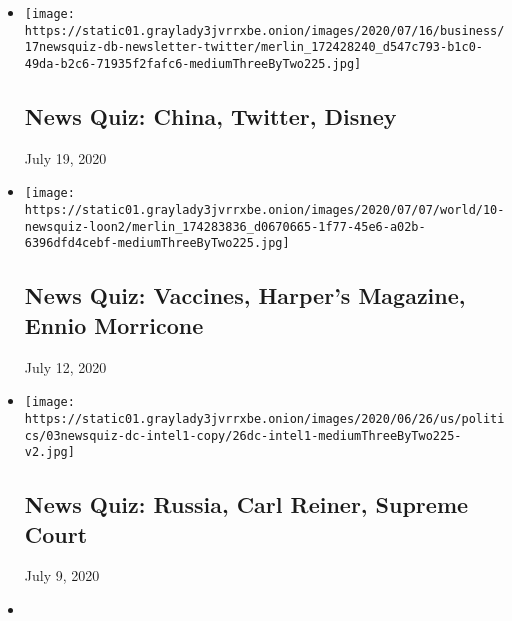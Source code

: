 \begin{itemize}
\item
  \href{https://www.nytimes3xbfgragh.onion/interactive/2020/07/17/briefing/china-twitter-disney-news-quiz.html}{}

  \texttt{[image: https://static01.graylady3jvrrxbe.onion/images/2020/07/16/business/17newsquiz-db-newsletter-twitter/merlin\_172428240\_d547c793-b1c0-49da-b2c6-71935f2fafc6-mediumThreeByTwo225.jpg]}

  \hypertarget{news-quiz-china-twitter-disney}{%
  \subsection{News Quiz: China, Twitter,
  Disney}\label{news-quiz-china-twitter-disney}}

  July 19, 2020
\item
  \href{https://www.nytimes3xbfgragh.onion/interactive/2020/07/10/briefing/vaccines-harpers-magazine-ennio-morricone-news-quiz.html}{}

  \texttt{[image: https://static01.graylady3jvrrxbe.onion/images/2020/07/07/world/10-newsquiz-loon2/merlin\_174283836\_d0670665-1f77-45e6-a02b-6396dfd4cebf-mediumThreeByTwo225.jpg]}

  \hypertarget{news-quiz-vaccines-harpers-magazine-ennio-morricone}{%
  \subsection{News Quiz: Vaccines, Harper's Magazine, Ennio
  Morricone}\label{news-quiz-vaccines-harpers-magazine-ennio-morricone}}

  July 12, 2020
\item
  \href{https://www.nytimes3xbfgragh.onion/interactive/2020/07/03/briefing/russia-carl-reiner-supreme-court-news-quiz.html}{}

  \texttt{[image: https://static01.graylady3jvrrxbe.onion/images/2020/06/26/us/politics/03newsquiz-dc-intel1-copy/26dc-intel1-mediumThreeByTwo225-v2.jpg]}

  \hypertarget{news-quiz-russia-carl-reiner-supreme-court}{%
  \subsection{News Quiz: Russia, Carl Reiner, Supreme
  Court}\label{news-quiz-russia-carl-reiner-supreme-court}}

  July 9, 2020
\item
  \href{https://www.nytimes3xbfgragh.onion/interactive/2020/06/26/briefing/geoffrey-berman-coronavirus-statues-news-quiz.html}{}


\end{itemize}
